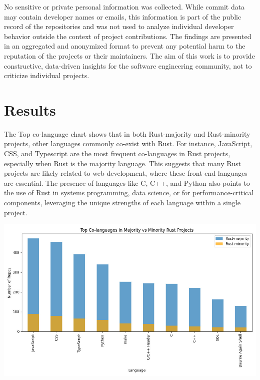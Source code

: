 \documentclass[11pt]{article}
\begin{document}
No sensitive or private personal information was collected. While commit data may contain developer names or emails, this information is part of the public record of the repositories and was not used to analyze individual developer behavior outside the context of project contributions. The findings are presented in an aggregated and anonymized format to prevent any potential harm to the reputation of the projects or their maintainers. The aim of this work is to provide constructive, data-driven insights for the software engineering community, not to criticize individual projects.

\section{Results}
The Top co-language chart shows that in both Rust-majority and Rust-minority projects, other languages commonly co-exist with Rust. For instance, JavaScript, CSS, and Typescript are the most frequent co-languages in Rust projects, especially when Rust is the majority language. This suggests that many Rust projects are likely related to web development, where these front-end languages are essential. The presence of languages like C, C++, and Python also points to the use of Rust in systems programming, data science, or for performance-critical components, leveraging the unique strengths of each language within a single project.

\begin{center}
\includegraphics[width=.9\linewidth]{./figures/colanguage_counts_majority_vs_minority.jpg}
\end{center}
\end{document}
